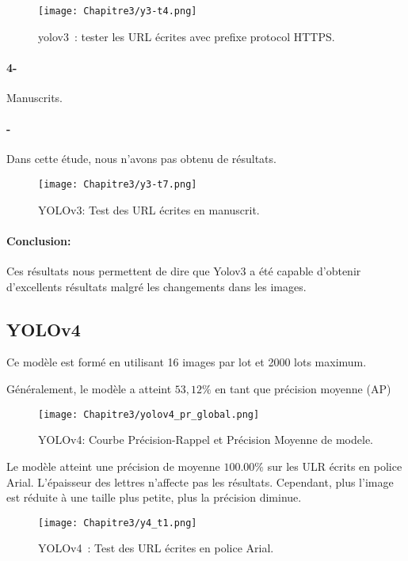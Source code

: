       \begin{figure}[H]
          \centering
           \texttt{[image: Chapitre3/y3-t4.png]}
           \caption{yolov3 : tester les URL écrites avec prefixe protocol HTTPS.}
           \label{y3_t4}
           \end{figure}


      \paragraph{4-} Manuscrits.
      \paragraph{-} Dans cette étude, nous n'avons pas obtenu de résultats.

      \begin{figure}[H]
          \centering
           \texttt{[image: Chapitre3/y3-t7.png]}
           \caption{YOLOv3: Test des URL écrites en manuscrit.}
           \label{y3_t7}
           \end{figure}

      \paragraph{Conclusion:} Ces résultats nous permettent de dire que Yolov3 a été capable d'obtenir d'excellents résultats malgré les changements dans les images.     

     \subsection{YOLOv4}
     Ce modèle est formé en utilisant 16 images par lot et 2000 lots maximum.

     Généralement, le modèle a atteint $53,12\%$ en tant que précision moyenne (AP)
     \begin{figure}[H]
               \centering
               \texttt{[image: Chapitre3/yolov4\_pr\_global.png]}
               \caption{YOLOv4: Courbe Précision-Rappel et Précision Moyenne de modele.}
               \label{y4_pr}
               \end{figure}
     
     Le modèle atteint une précision de moyenne $100.00\%$ sur les ULR écrits en police Arial. L'épaisseur des lettres n'affecte pas les résultats. Cependant, plus l'image est réduite à une taille plus petite, plus la précision diminue.
     \begin{figure}[H]
               \centering
               \texttt{[image: Chapitre3/y4\_t1.png]}
               \caption{YOLOv4 : Test des URL écrites en police Arial.}
               \label{y4_t1}
               \end{figure}
     
